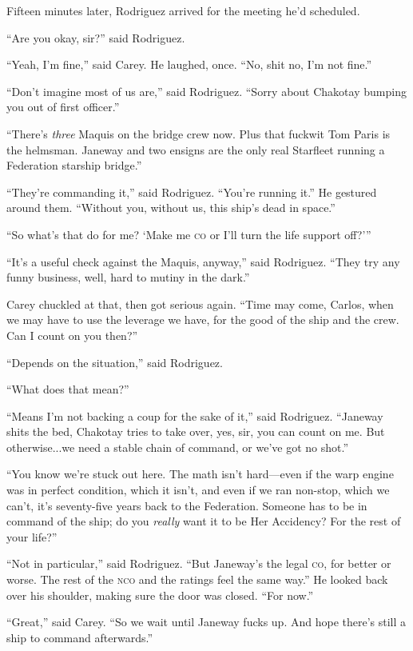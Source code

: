 \documentclass[twoside,letterpaper,12pt]{memoir}
\begin{document}
Fifteen minutes later, Rodriguez arrived for the meeting he’d scheduled. 

``Are you okay, sir?” said Rodriguez. 

``Yeah, I’m fine,” said Carey. He laughed, once. ``No, shit no, I’m not fine.” 

``Don’t imagine most of us are,” said Rodriguez. ``Sorry about Chakotay bumping you out of first officer.” 

``There’s \textit{three} Maquis on the bridge crew now. Plus that fuckwit Tom Paris is the helmsman. Janeway and two ensigns are the only real Starfleet running a Federation starship bridge.” 

``They’re commanding it,” said Rodriguez. ``You’re running it.” He gestured around them. ``Without you, without us, this ship’s dead in space.” 

``So what’s that do for me? `Make me \textsc{co} or I’ll turn the life support off?''' 

``It’s a useful check against the Maquis, anyway,” said Rodriguez. ``They try any funny business, well, hard to mutiny in the dark.” 

Carey chuckled at that, then got serious again. ``Time may come, Carlos, when we may have to use the leverage we have, for the good of the ship and the crew. Can I count on you then?” 

``Depends on the situation,” said Rodriguez. 

``What does that mean?” 

``Means I’m not backing a coup for the sake of it,” said Rodriguez. ``Janeway shits the bed, Chakotay tries to take over, yes, sir, you can count on me. But otherwise...we need a stable chain of command, or we’ve got no shot.” 

``You know we’re stuck out here. The math isn’t hard—even if the warp engine was in perfect condition, which it isn’t, and even if we ran non-stop, which we can’t, it’s seventy-five years back to the Federation. Someone has to be in command of the ship; do you \textit{really }want it to be Her Accidency? For the rest of your life?” 

``Not in particular,” said Rodriguez. ``But Janeway’s the legal \textsc{co}, for better or worse. The rest of the \textsc{nco} and the ratings feel the same way.” He looked back over his shoulder, making sure the door was closed. ``For now.” 

``Great,” said Carey. ``So we wait until Janeway fucks up. And hope there’s still a ship to command afterwards.” 
\end{document}
